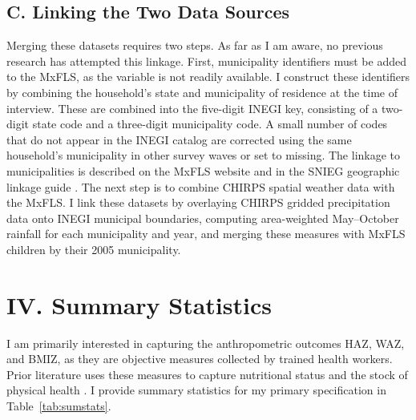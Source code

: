 \documentclass[12pt]{article}
\begin{document}
\subsection*{C. Linking the Two Data Sources}

Merging these datasets requires two steps. As far as I am aware, no previous research has attempted this linkage. First, municipality identifiers must be added to the MxFLS, as the variable is not readily available. I construct these identifiers by combining the household's state and municipality of residence at the time of interview. These are combined into the five-digit INEGI key, consisting of a two-digit state code and a three-digit municipality code. A small number of codes that do not appear in the INEGI catalog are corrected using the same household's municipality in other survey waves or set to missing. The linkage to municipalities is described on the MxFLS website and in the SNIEG geographic linkage guide \parencite{mxflsFrequentlyAskedQuestions,inegiGuiaParaVinculacion2025}. The next step is to combine CHIRPS spatial weather data with the MxFLS. I link these datasets by overlaying CHIRPS gridded precipitation data onto INEGI municipal boundaries, computing area-weighted May--October rainfall for each municipality and year, and merging these measures with MxFLS children by their 2005 municipality.

\section*{IV. Summary Statistics}\label{sec:IV}

I am primarily interested in capturing the anthropometric outcomes HAZ, WAZ, and BMIZ, as they are objective measures collected by trained health workers. Prior literature uses these measures to capture nutritional status and the stock of physical health \parencite{adairAgeSpecificDeterminantsStunting1997,hoddinottAdultConsequencesGrowth2013,gilesProtectingChildNutritional2015}. I provide summary statistics for my primary specification in Table~\ref{tab:sumstats}.
\end{document}
